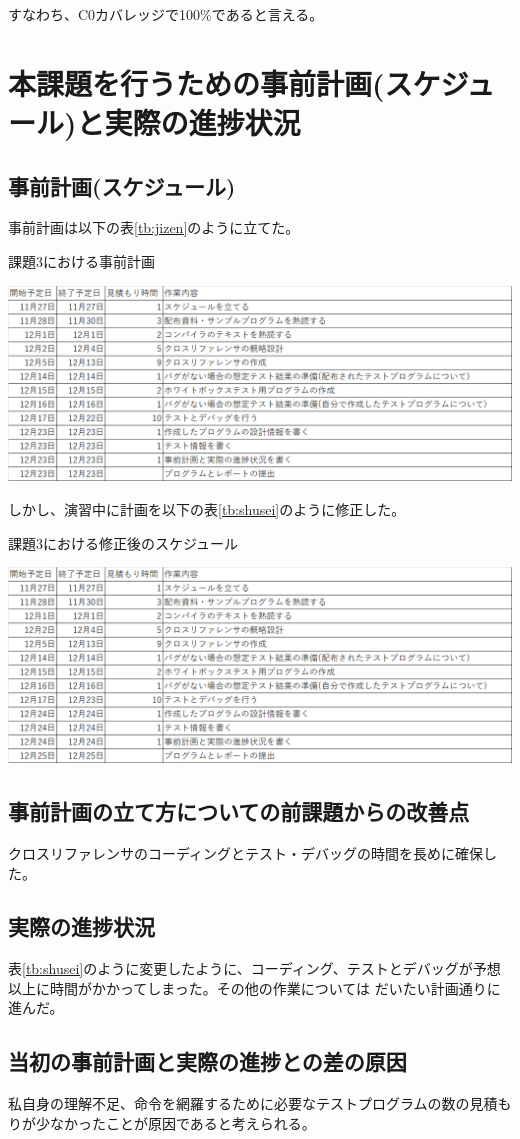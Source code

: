 \documentclass{jarticle}
\begin{document}
すなわち、C0カバレッジで100\%であると言える。
\section{本課題を行うための事前計画(スケジュール)と実際の進捗状況}
\subsection{事前計画(スケジュール)}
事前計画は以下の表\ref{tb:jizen}のように立てた。
\begin{table}[H]
\begin{center}
\caption{課題3における事前計画}
\label{tb:jizen}
\includegraphics[scale=0.6]{kadai3-jizen.png}
\end{center}
\end{table}

しかし、演習中に計画を以下の表\ref{tb:shusei}のように修正した。
\begin{table}[H]
\begin{center}
\caption{課題3における修正後のスケジュール}
\label{tb:shusei}
\includegraphics[scale=0.6]{kadai3-shusei.png}
\end{center}
\end{table}
\subsection{事前計画の立て方についての前課題からの改善点}
クロスリファレンサのコーディングとテスト・デバッグの時間を長めに確保した。
\subsection{実際の進捗状況}
表\ref{tb:shusei}のように変更したように、コーディング、テストとデバッグが予想以上に時間がかかってしまった。その他の作業については
だいたい計画通りに進んだ。
\subsection{当初の事前計画と実際の進捗との差の原因}
私自身の理解不足、命令を網羅するために必要なテストプログラムの数の見積もりが少なかったことが原因であると考えられる。
\end{document}
